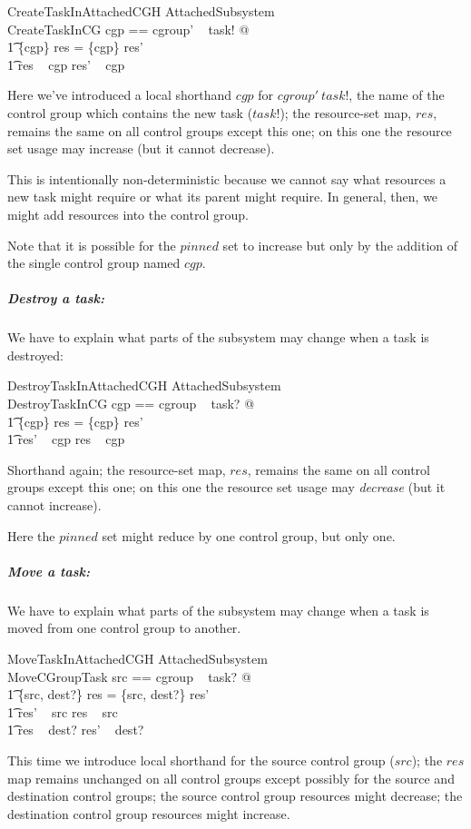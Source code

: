 \documentclass[a4paper,twoside,12pt]{article}
\begin{document}
\begin{schema}{CreateTaskInAttachedCGH}
\Delta AttachedSubsystem \\
CreateTaskInCG
\where
\LET cgp == cgroup' ~ task! @ \\
\t1 \{cgp\} \ndres res = \{cgp\} \ndres res' \land \\
\t1 res ~ cgp \subseteq res' ~ cgp
\end{schema}
Here we've introduced a local shorthand $cgp$ for $cgroup' ~ task!$, the name of the control group which contains
the new task ($task!$); the resource-set map, $res$, remains the same on all control groups except this one;
on this one the resource set usage may increase (but it cannot decrease).

This is intentionally non-deterministic because we cannot say what resources a new task might require or
what its parent might require. In general, then, we might add resources into the control group.

Note that it is possible for the $pinned$ set to increase but only by the addition of the single control group
named $cgp$.

\subparagraph{Destroy a task:}
We have to explain what parts of the subsystem may change when a task is destroyed:

\begin{schema}{DestroyTaskInAttachedCGH}
\Delta AttachedSubsystem \\
DestroyTaskInCG
\where
\LET cgp == cgroup ~ task? @ \\
\t1 \{cgp\} \ndres res = \{cgp\} \ndres res' \land \\
\t1 res' ~ cgp \subseteq res ~ cgp
\end{schema}
Shorthand again;  the resource-set map, $res$, remains the same on all control groups except this one;
on this one the resource set usage may \emph{decrease} (but it cannot increase).

Here the $pinned$ set might reduce by one control group, but only one.

\subparagraph{Move a task:}
We have to explain what parts of the subsystem may change when a task is moved from one control group to another.

\begin{schema}{MoveTaskInAttachedCGH}
\Delta AttachedSubsystem \\
MoveCGroupTask
\where
\LET src == cgroup ~ task? @ \\
\t1 \{src, dest?\} \ndres res = \{src, dest?\} \ndres res' \land \\
\t1 res' ~ src \subseteq res ~ src \land \\
\t1 res ~ dest? \subseteq res' ~ dest?
\end{schema}
This time we introduce local shorthand for the source control group ($src$);
the $res$ map remains unchanged on all control groups except possibly for the source and destination control groups;
the source control group resources might decrease;
the destination control group resources might increase.
\end{document}
